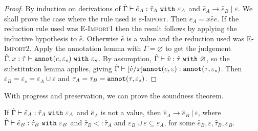{\begin{proof}
By induction on derivations of $\hat \Gamma \vdash \hat e_A: \hat \tau_A~\mathtt{with}~
\varepsilon_A$ and $\hat e_A \longrightarrow \hat e_B \mid \varepsilon$. We shall
prove the case where the rule used is \textsc{$\varepsilon$-Import}. Then $e_A =
{x}{\hat e}{e}$. If the reduction rule used was
\textsc{E-Import1} then the result follows by applying the inductive hypothesis to
$\hat e$. Otherwise $\hat e$ is a value and the reduction used was
\textsc{E-Import2}. Apply the annotation lemma with $\Gamma = \varnothing$ to
get the judgement $\hat \Gamma, x: \hat \tau \vdash \mathtt{annot}(e, \varepsilon_s)~
\mathtt{with}~ \varepsilon_s$. By assumption, $\hat \Gamma \vdash \hat v: \hat \tau~
 \mathtt{with}~ \varnothing$, so the substitution lemma applies, giving $\hat \Gamma
\vdash [\hat v/x]\mathtt{annot}(e, \varepsilon): \mathtt{annot}(\tau, \varepsilon_s)$. Then
$\varepsilon_B = \varepsilon_s = \varepsilon_A \cup \varepsilon$ and $\tau_A =
\tau_B = \mathtt{annot}(\tau, \varepsilon_s)$.

\end{proof}

With progress and preservation, we can prove the soundness theorem.

\begin{theorem}
If $\hat \Gamma \vdash \hat e_A: \hat \tau_A~\mathtt{with}~ \varepsilon_A$ and $\hat e_A$ is not a value, then $\hat e_A \longrightarrow \hat e_B~|~\varepsilon$, where $\hat \Gamma \vdash \hat e_B: \hat \tau_B~\mathtt{with}~ \varepsilon_B$ and $\hat \tau_B <: \hat \tau_A$ and $\varepsilon_B \cup \varepsilon \subseteq \varepsilon_A$, for some $\hat e_B, \varepsilon, \hat \tau_B, \varepsilon_B$.
\end{theorem}
}
